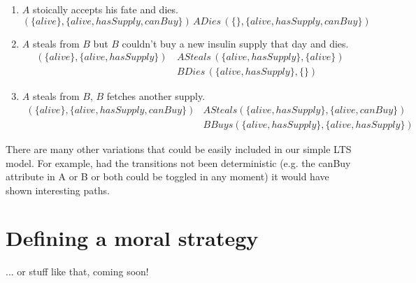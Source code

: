 \documentclass{article}
\begin{document}
\begin{enumerate}
    \item $A$ stoically accepts his fate and dies.
        \begin{equation*}
            (\{alive\}, \{alive, hasSupply, canBuy\}) \, ADies \, (\{\}, \{alive, hasSupply, canBuy\})
        \end{equation*}
    \item $A$ steals from $B$ but $B$ couldn't buy a new insulin supply that day and dies.
        \begin{equation*}
        \begin{split}
            (\{alive\}, \{alive, hasSupply\}) \, &ASteals \, (\{alive, hasSupply\}, \{alive\}) \\
                                                 & BDies \, (\{alive, hasSupply\}, \{\})
        \end{split}
        \end{equation*}
    \item $A$ steals from $B$, $B$ fetches another supply.
    \begin{equation*}
        \begin{split}
            (\{alive\}, \{alive, hasSupply, canBuy\}) & ASteals (\{alive, hasSupply\}, \{alive, canBuy\}) \\
            & BBuys (\{alive, hasSupply\}, \{alive, hasSupply\})
        \end{split}
    \end{equation*}
\end{enumerate}

There are many other variations that could be easily included in our simple LTS model. For example, had the transitions not been deterministic (e.g. the canBuy attribute in A or B or both could be toggled in any moment) it would have shown interesting paths.

\section{Defining a moral strategy}
... or stuff like that, coming soon!
\end{document}
